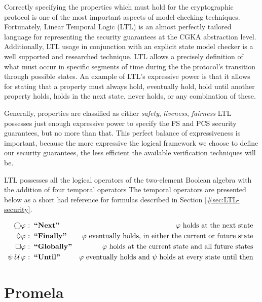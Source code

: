 Correctly specifying the properties which must hold for the cryptographic protocol is one of the most important aspects of model checking techniques.
Fortunately, Linear Temporal Logic (LTL) \autocite{4567924} is an almost perfectly tailored language for representing the security guarantees at the CGKA abstraction level.
Additionally, LTL usage in conjunction with an explicit state model checker is a well supported and researched technique.
LTL allows a precisely definition of what must occur in specific segments of time during the the protocol's transition through possible states.
An example of LTL's expressive power is that it allows for stating that a property must always hold, eventually hold, hold until another property holds, holds in the next state, never holds, or any combination of these.

Generally, properties are classified as either \emph{safety}, \emph{liveness}, \emph{fairness}
LTL possesses just enough expressive power to specify the FS and PCS security guarantees, but no more than that.
This perfect balance of expressiveness is important, because the more expressive the logical framework we choose to define our security guarantees, the less efficient the available verification techniques will be.

LTL possesses all the logical operators of the two-element Boolean algebra with the addition of four temporal operators
The temporal operators are presented below as a short had reference for formulas described in Section \ref{#sec:LTL-security}.

\[
\begin{aligned}[t]
                 \bigcirc & \varphi & \!\!\!\!\textrm{:} & \;\;\textbf{``Next''}     & \varphi\textrm{ holds at the next state} \hfill~ &\\
                 \Diamond & \varphi & \!\!\!\!\textrm{:} & \;\;\textbf{``Finally''}  & \varphi\textrm{ eventually holds, in either the current or future state} \hfill~ &\\
                 \Box     & \varphi & \!\!\!\!\textrm{:} & \;\;\textbf{``Globally''} & \varphi\textrm{ holds at the current state and all future states} \hfill~ &\\
  \psi \;{\mathcal {U}}\, & \varphi & \!\!\!\!\textrm{:} & \;\;\textbf{``Until''}    & \varphi\textrm{ eventually holds and $\psi$ holds at every state until then} \hfill~ &\\
\end{aligned}
\]

\hypertarget{promela}{%
\section{Promela}\label{promela}}

